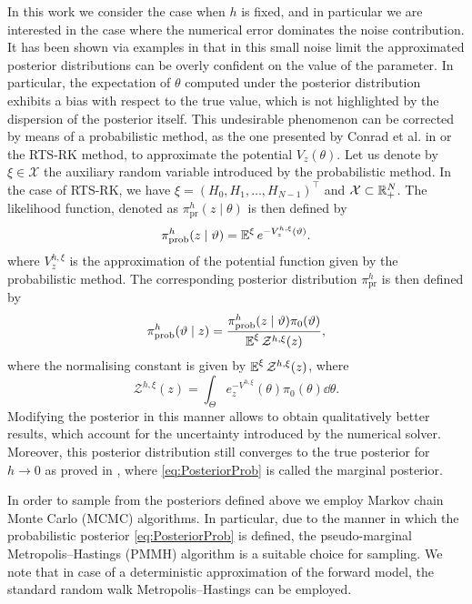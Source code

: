 \documentclass[10pt]{article}
\begin{document}
In this work we consider the case when $h$ is fixed, and in particular we are interested in the case where the numerical error dominates the noise contribution. It has been shown via examples in \cite{CGS17, COS17} that in this small noise limit the approximated posterior distributions can be overly confident on the value of the parameter. In particular, the expectation of $\theta$ computed under the posterior distribution exhibits a bias with respect to the true value, which is not highlighted by the dispersion of the posterior itself. This undesirable phenomenon can be corrected by means of a probabilistic method, as the one presented by Conrad et al. in \cite{CGS17} or the RTS-RK method, to approximate the potential $V_z(\theta)$. Let us denote by $\xi \in \mathcal{X}$ the auxiliary random variable introduced by the probabilistic method. In the case of RTS-RK, we have $\xi = (H_0, H_1, \ldots, H_{N-1})^\top$ and $\mathcal{X} \subset \mathbb{R}_+^N$. The likelihood function, denoted as  $\pi^h_{\mathrm{pr}}(z\mid\theta)$ is then defined by
\begin{equation}\label{eq:LikelihoodProb}
	\pi^h_{\mathrm{prob}}(z\mid \vartheta) = \operatorname{\mathbb{E}}^\xi e^{-V^{h,\xi}_{z}(\vartheta)}.
\end{equation}
where $V^{h, \xi}_{z}$ is the approximation of the potential function given by the probabilistic method. The corresponding posterior distribution $\pi^h_{\mathrm{pr}}$ is then defined by
\begin{equation}\label{eq:PosteriorProb}
	\pi^h_{\mathrm{prob}}(\vartheta\mid z) = \frac{\pi^h_{\mathrm{prob}}(z\mid \vartheta)\pi_0(\vartheta)}{\operatorname{\mathbb{E}}^\xi \mathcal Z^{h, \xi}(z)},
\end{equation}
where the normalising constant is given by $\operatorname{\mathbb{E}}^\xi \mathcal Z^{h, \xi}(z)$, where
\begin{equation}
	\mathcal Z^{h, \xi}(z) = \int_{\Theta} e^{-V^{h,\xi}}_{z}(\theta) \pi_0(\theta) \dd \theta.
\end{equation}
Modifying the posterior in this manner allows to obtain qualitatively better results, which account for the uncertainty introduced by the numerical solver. Moreover, this posterior distribution still converges to the true posterior for $h \to 0$ as proved in \cite{LST18}, where \eqref{eq:PosteriorProb} is called the marginal posterior.

In order to sample from the posteriors defined above we employ Markov chain Monte Carlo (MCMC) algorithms. In particular, due to the manner in which the probabilistic posterior \eqref{eq:PosteriorProb} is defined, the pseudo-marginal Metropolis--Hastings (PMMH) algorithm \cite{AnR09} is a suitable choice for sampling. We note that in case of a deterministic approximation of the forward model, the standard random walk Metropolis--Hastings can be employed.
\end{document}
